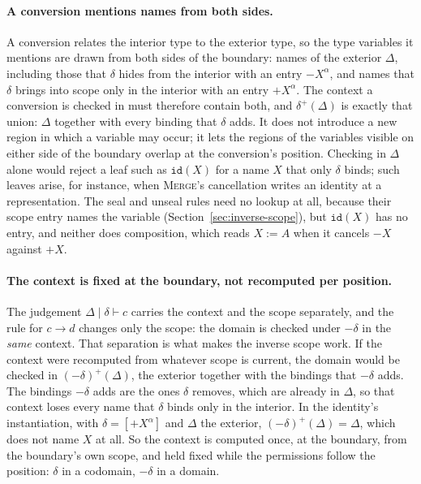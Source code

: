 \documentclass[acmsmall,screen,review,anonymous,nonacm]{acmart}
\newcommand{\id}[1]{\key{id}(#1)}
\newcommand{\dual}[1]{-#1}
\newcommand{\seal}[1]{-#1}
\newcommand{\unseal}[1]{+#1}
\newcommand{\tu}{{\to}}
\newcommand{\by}{{:=}}
\newcommand{\key}[1]{\mathtt{#1}}
\begin{document}
\paragraph{A conversion mentions names from both sides.}
A conversion relates the interior type to the exterior type, so the
type variables it mentions are drawn from both sides of the boundary:
names of the exterior $\Delta$, including those that $\delta$ hides
from the interior with an entry ${-X}^\alpha$, and names that $\delta$
brings into scope only in the interior with an entry ${+X}^\alpha$.
The context a conversion is checked in must therefore contain both, and
$\delta^{+}(\Delta)$ is exactly that union: $\Delta$ together with
every binding that $\delta$ adds.  It does not introduce a new region
in which a variable may occur; it lets the regions of the variables
visible on either side of the boundary overlap at the conversion's
position.  Checking in $\Delta$ alone would reject a leaf such as
$\id{X}$ for a name $X$ that only $\delta$ binds; such leaves arise, for
instance, when \textsc{Merge}'s cancellation writes an identity at a
representation.  The seal and unseal rules need no lookup at all,
because their scope entry names the variable
(Section~\ref{sec:inverse-scope}), but $\id{X}$ has no entry, and
neither does composition, which reads $X \by A$ when it cancels
$\seal{X}$ against $\unseal{X}$.

\paragraph{The context is fixed at the boundary, not recomputed per position.}
The judgement $\Delta \mid \delta \vdash c$ carries the context and the
scope separately, and the rule for $c \tu d$ changes only the scope: the
domain is checked under $\dual{\delta}$ in the \emph{same} context.
That separation is what makes the inverse scope work.  If the context
were recomputed from whatever scope is current, the domain would be
checked in $(\dual{\delta})^{+}(\Delta)$, the exterior together with
the bindings that $\dual{\delta}$ adds.  The bindings $\dual{\delta}$
adds are the ones $\delta$ removes, which are already in $\Delta$, so
that context loses every name that $\delta$ binds only in the interior.
In the identity's instantiation, with $\delta = [{+X}^\alpha]$ and
$\Delta$ the exterior, $(\dual{\delta})^{+}(\Delta) = \Delta$, which
does not name $X$ at all.  So the context is computed once, at the
boundary, from the boundary's own scope, and held fixed while the
permissions follow the position: $\delta$ in a codomain, $\dual{\delta}$
in a domain.
\end{document}
